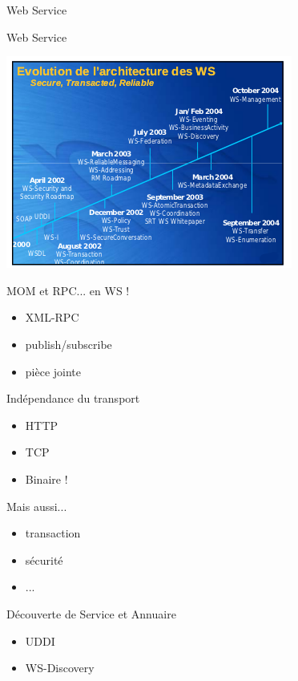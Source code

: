 {\begin{frame}{Web Service}
  \end{frame}

  \begin{frame}{Web Service}
    \begin{center}
      \includegraphics[scale=0.8]{img/ws-star.png}
    \end{center}
  \end{frame}

  \begin{frame}
    \begin{block}{MOM et RPC... en WS !}
      \begin{itemize}
        \item XML-RPC
        \item publish/subscribe
        \item pièce jointe
      \end{itemize}
    \end{block}

    \begin{block}{Indépendance du transport}
      \begin{itemize}
        \item HTTP
        \item TCP
        \item Binaire !
      \end{itemize}
    \end{block}
  \end{frame}

  \begin{frame}
    \begin{block}{Mais aussi...}
      \begin{itemize}
        \item transaction
        \item sécurité
        \item ...
      \end{itemize}
    \end{block}

    \begin{block}{Découverte de Service et Annuaire}
      \begin{itemize}
        \item UDDI
        \item WS-Discovery
      \end{itemize}
    \end{block}
  \end{frame}
}


